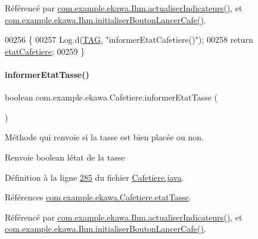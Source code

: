 Référencé par \hyperlink{_ihm_8java_source_l00855}{com.\+example.\+ekawa.\+Ihm.\+actualiser\+Indicateurs()}, et \hyperlink{_ihm_8java_source_l00526}{com.\+example.\+ekawa.\+Ihm.\+initialiser\+Bouton\+Lancer\+Cafe()}.


\begin{DoxyCode}
00256     \{
00257         Log.d(\hyperlink{classcom_1_1example_1_1ekawa_1_1_cafetiere_aa0c1fd99a2508b06c462aea17034aa91}{TAG}, \textcolor{stringliteral}{"informerEtatCafetiere()"});
00258         \textcolor{keywordflow}{return} \hyperlink{classcom_1_1example_1_1ekawa_1_1_cafetiere_ae170dd018d1e740b3bda080d1cc3d900}{etatCafetiere};
00259     \}
\end{DoxyCode}
\mbox{\label{classcom_1_1example_1_1ekawa_1_1_cafetiere_ae3c04cc0258cbe554eee5894655c379e}} 
\paragraph{\texorpdfstring{informer\+Etat\+Tasse()}{informerEtatTasse()}}
{\footnotesize\ttfamily boolean com.\+example.\+ekawa.\+Cafetiere.\+informer\+Etat\+Tasse (\begin{DoxyParamCaption}{ }\end{DoxyParamCaption})}



Méthode qui renvoie si la tasse est bien placée ou non. 

\begin{DoxyReturn}{Renvoie}
boolean l\textquotesingle{}état de la tasse 
\end{DoxyReturn}


Définition à la ligne \hyperlink{_cafetiere_8java_source_l00285}{285} du fichier \hyperlink{_cafetiere_8java_source}{Cafetiere.\+java}.



Références \hyperlink{_cafetiere_8java_source_l00091}{com.\+example.\+ekawa.\+Cafetiere.\+etat\+Tasse}.



Référencé par \hyperlink{_ihm_8java_source_l00855}{com.\+example.\+ekawa.\+Ihm.\+actualiser\+Indicateurs()}, et \hyperlink{_ihm_8java_source_l00526}{com.\+example.\+ekawa.\+Ihm.\+initialiser\+Bouton\+Lancer\+Cafe()}.


